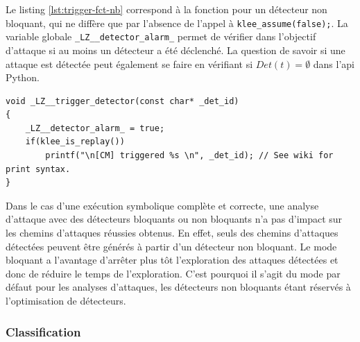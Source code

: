                 \begin{sloppypar}
                Le listing \ref{lst:trigger-fct-nb} correspond à la fonction pour un détecteur non bloquant, qui ne diffère que par l'absence de l'appel à \texttt{klee\_assume(false);}.
                La variable globale \texttt{\_LZ\_\_detector\_alarm\_} permet de vérifier dans l'objectif d'attaque si au moins un détecteur a été déclenché. 
                La question de savoir si une attaque est détectée peut également se faire en vérifiant si $Det(t) = \emptyset$ dans l'\gls{api} Python.
                \end{sloppypar}
    
\begin{lstlisting}     
void _LZ__trigger_detector(const char* _det_id)
{
    _LZ__detector_alarm_ = true;    
    if(klee_is_replay()) 
        printf("\n[CM] triggered %s \n", _det_id); // See wiki for print syntax.
}

\end{lstlisting}  

                Dans le cas d'une exécution symbolique complète et correcte, une analyse d'attaque avec des détecteurs bloquants ou non bloquants n'a pas d'impact sur les chemins d'attaques réussies obtenus.
                En effet, seuls des chemins d'attaques détectées peuvent être générés à partir d'un détecteur non bloquant.
                Le mode bloquant a l'avantage d'arrêter plus tôt l'exploration des attaques détectées et donc de réduire le temps de l'exploration. C'est pourquoi il s'agit du mode par défaut pour les analyses d'attaques, les détecteurs non bloquants étant réservés à l'optimisation de détecteurs.
            
            \subsubsection{Classification}
            \label{sec:ch6-impl-classification}
    
